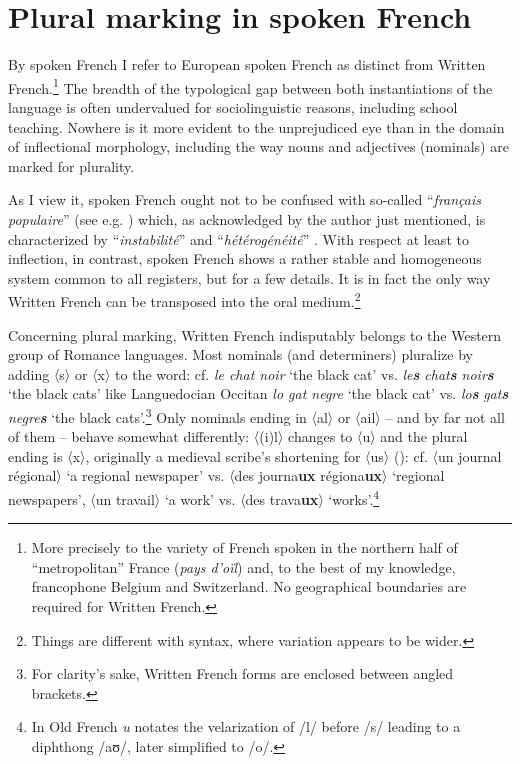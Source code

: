 \documentclass[output=paper]{langscibook}
\begin{document}
\section{Plural marking in spoken French}
\label{sec:kihm:2}

By spoken French I refer to European spoken French as distinct from Written French.\footnote{More precisely to the variety of French spoken in the northern half of “metropolitan” France (\textit{pays d’oïl}) and, to the best of my knowledge, francophone Belgium and Switzerland. No geographical boundaries are required for Written French.} The breadth of the typological gap between both instantiations of the language is often undervalued for sociolinguistic reasons, including school teaching. Nowhere is it more evident to the unprejudiced eye than in the domain of inflectional morphology, including the way nouns and adjectives (nominals) are marked for plurality.

\begin{sloppypar}
As I view it, spoken French ought not to be confused with so-called “\textit{français populaire}” (see e.g. \citealt{Gadet1992}) which, as acknowledged by the author just mentioned, is characterized by “\textit{instabilité}” and “\textit{hétérogénéité}” \citep[122]{Gadet1992}. With respect at least to inflection, in contrast, spoken French shows a rather stable and homogeneous system common to all registers, but for a few details. It is in fact the only way Written French can be transposed into the oral medium.\footnote{Things are different with syntax, where variation appears to be wider.}
\end{sloppypar}

Concerning plural marking, Written French indisputably belongs to the Western group of Romance languages. Most nominals (and determiners) pluralize by adding 〈s〉 or 〈x〉 to the word: cf. \textit{le chat noir} ‘the black cat’ vs. \textit{le\textbf{s} chat\textbf{s} noir\textbf{s} }‘the black cats’ like Languedocian Occitan \textit{lo gat negre} ‘the black cat’ vs. \textit{lo}\textbf{\textit{s}} \textit{gat}\textbf{\textit{s}} \textit{negre}\textbf{\textit{s}} ‘the black cats’.\footnote{For clarity’s sake, Written French forms are enclosed between angled brackets.} Only nominals ending in 〈al〉 or 〈ail〉 -- and by far not all of them -- behave somewhat differently: 〈(i)l〉 changes to 〈u〉 and the plural ending is 〈x〉, originally a medieval scribe’s shortening for 〈us〉 (\cites[95]{Cohen1987}[20]{Moignet1988}): cf. 〈un journal régional〉 ‘a regional newspaper’ vs. 〈des journa\textbf{ux} régiona\textbf{ux}〉 ‘regional newspapers’, 〈un travail〉 ‘a work’ vs. 〈des trava\textbf{ux}〉 ‘works’.\footnote{In Old French \textit{u} notates the velarization of /l/ before /s/ leading to a diphthong /aʊ/, later simplified to /o/.}
\end{document}
